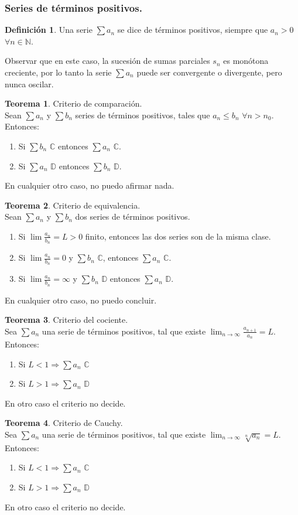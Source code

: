 \documentclass[10pt]{article}
\theoremstyle{definition}
\newtheorem{definition}{Definición}[section]
\newtheorem{theorem}{Teorema}[section]
\begin{document}
\subsubsection{Series de términos positivos.}
\begin{definition}
	Una serie $\sum a_n$ se dice de términos positivos, siempre que $a_n>0$ $\forall n \in \mathbb{N}$.
\end{definition}
Observar que en este caso, la sucesión de sumas parciales $s_n$ es monótona creciente, por lo tanto la serie $\sum a_n$ puede ser convergente o divergente, pero nunca oscilar.
\begin{theorem}{Criterio de comparación.}
	\\Sean $\sum a_n$ y $\sum b_n$ series de términos positivos, tales que $a_n\le b_n$ $\forall n>n_0$. Entonces:
	\begin{enumerate}
		\item Si $\sum b_n$ $\mathbb{C}$ entonces $\sum a_n$ $\mathbb{C}$.
		\item Si $\sum a_n$ $\mathbb{D}$ entonces $\sum b_n$ $\mathbb{D}$.
	\end{enumerate}
	En cualquier otro caso, no puedo afirmar nada.
\end{theorem}
\begin{theorem}{Criterio de equivalencia.}
	\\Sean $\sum a_n$ y $\sum b_n$ dos series de términos positivos.
	\begin{enumerate}
		\item Si $\lim \frac{a_n}{b_n}=L >0$ finito, entonces las dos series son de la misma clase.
		\item Si $\lim \frac{a_n}{b_n}=0$ y $\sum b_n$ $\mathbb{C}$, entonces $\sum a_n$ $\mathbb{C}$.
		\item Si $\lim \frac{a_n}{b_n}=\infty$ y $\sum b_n$ $\mathbb{D}$ entonces $\sum a_n$ $\mathbb{D}$.
	\end{enumerate}
	En cualquier otro caso, no puedo concluir.
\end{theorem}
\begin{theorem}{Criterio del cociente.}
	\\Sea $\sum a_n$ una serie de términos positivos, tal que existe $\lim_{n \to \infty} \frac{a_{n+1}}{a_n}=L$. Entonces:
	\begin{enumerate}
		\item Si $L<1\Rightarrow \sum a_n$ $\mathbb{C}$
		\item Si $L>1\Rightarrow \sum a_n$ $\mathbb{D}$
	\end{enumerate}
	En otro caso el criterio no decide.
\end{theorem}
\begin{theorem}{Criterio de Cauchy.}
	\\Sea $\sum a_n$ una serie de términos positivos, tal que existe $\lim_{n \to \infty} \sqrt[n]{a_n}=L$. Entonces:
	\begin{enumerate}
		\item Si $L<1\Rightarrow\sum a_n$ $\mathbb{C}$
		\item Si $L>1\Rightarrow\sum a_n$ $\mathbb{D}$
	\end{enumerate}
	En otro caso el criterio no decide.
\end{theorem}\newpage
\end{document}
